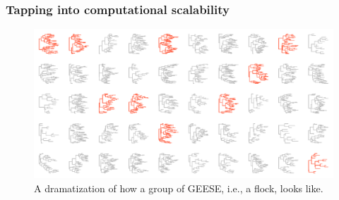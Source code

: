 \documentclass[aspectratio=169, 9pt]{beamer}
\begin{document}
%	
%	
%	
%	

\begin{frame}
	\frametitle{Tapping into computational scalability}
	\pause
	\begin{figure}
		\includegraphics[width=.8\linewidth]{flock-plot.pdf}
		\caption{A dramatization of how a group of GEESE, i.e., a flock, looks like.}
	\end{figure}

\end{frame}
\end{document}
